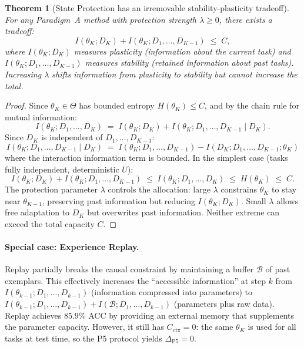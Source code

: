 \documentclass{article}
\newtheorem{theorem}{Theorem}
\begin{document}
\begin{theorem}[State Protection has an irremovable stability-plasticity tradeoff]
\label{thm:sp_tradeoff}
For any Paradigm~A method with protection strength $\lambda \geq 0$, there exists a tradeoff:
\begin{equation}
\label{eq:sp_tradeoff}
    I(\theta_K; D_K) + I(\theta_K; D_1, \ldots, D_{K-1}) \;\leq\; C,
\end{equation}
where $I(\theta_K; D_K)$ measures plasticity (information about the current task) and $I(\theta_K; D_1, \ldots, D_{K-1})$ measures stability (retained information about past tasks). Increasing $\lambda$ shifts information from plasticity to stability but cannot increase the total.
\end{theorem}

\begin{proof}
Since $\theta_K \in \Theta$ has bounded entropy $H(\theta_K) \leq C$, and by the chain rule for mutual information:
\begin{equation}
    I(\theta_K; D_1, \ldots, D_K) \;=\; I(\theta_K; D_K) + I(\theta_K; D_1, \ldots, D_{K-1} \mid D_K).
\end{equation}
Since $D_K$ is independent of $D_1, \ldots, D_{K-1}$:
\begin{equation}
    I(\theta_K; D_1, \ldots, D_{K-1} \mid D_K) \;=\; I(\theta_K; D_1, \ldots, D_{K-1}) - I(D_K; D_1, \ldots, D_{K-1}; \theta_K)
\end{equation}
where the interaction information term is bounded. In the simplest case (tasks fully independent, deterministic $U$):
\begin{equation}
    I(\theta_K; D_K) + I(\theta_K; D_1, \ldots, D_{K-1}) \;\leq\; I(\theta_K; D_1, \ldots, D_K) \;\leq\; H(\theta_K) \;\leq\; C.
\end{equation}
The protection parameter $\lambda$ controls the allocation: large $\lambda$ constrains $\theta_K$ to stay near $\theta_{K-1}$, preserving past information but reducing $I(\theta_K; D_K)$. Small $\lambda$ allows free adaptation to $D_K$ but overwrites past information. Neither extreme can exceed the total capacity $C$.
\end{proof}

\paragraph{Special case: Experience Replay.} Replay partially breaks the causal constraint by maintaining a buffer $\mathcal{B}$ of past exemplars. This effectively increases the ``accessible information'' at step $k$ from $I(\theta_{k-1}; D_1, \ldots, D_{k-1})$ (information compressed into parameters) to $I(\theta_{k-1}; D_1, \ldots, D_{k-1}) + I(\mathcal{B}; D_1, \ldots, D_{k-1})$ (parameters plus raw data). Replay achieves 85.9\% ACC by providing an external memory that supplements the parameter capacity. However, it still has $C_\mathrm{ctx} = 0$: the same $\theta_K$ is used for all tasks at test time, so the P5 protocol yields $\Delta_\mathrm{P5} = 0$.
\end{document}
